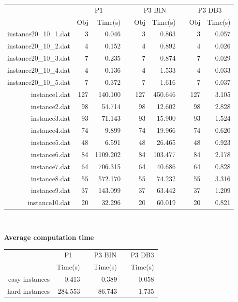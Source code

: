 \newpage
\begin{table*}[h!]\centering
{}
\begin{tabular}{@{}rrrcrrcrr@{}}\toprule
& \multicolumn{2}{c}{P1} & \phantom{abc} & \multicolumn{2}{c}{P3 BIN} & \phantom{abc} & \multicolumn{2}{c}{P3 DB3}\\
\cmidrule{2-3} \cmidrule{5-6} \cmidrule{8-9}
& Obj & Time(s) & & Obj & Time(s) & & Obj & Time(s)\\ \midrule
instance20\_10\_1.dat & 3 & 0.046 & & 3 & 0.863 & & 3 & 0.057 \\
instance20\_10\_2.dat & 4 & 0.152 & & 4 & 0.892 & & 4 & 0.026 \\
instance20\_10\_3.dat & 7 & 0.235 & & 7 & 0.874 & & 7 & 0.029 \\
instance20\_10\_4.dat & 4 & 0.136 & & 4 & 1.533 & & 4 & 0.033 \\
instance20\_10\_5.dat & 7 & 0.372 & & 7 & 1.616 & & 7 & 0.037 \\
instance1.dat & 127 & 140.100 & & 127 & 450.646 & & 127 & 3.105 \\
instance2.dat & 98 & 54.714 & & 98 & 12.602 & & 98 & 2.828 \\
instance3.dat & 93 & 71.143 & & 93 & 15.900 & & 93 & 1.524 \\
instance4.dat & 74 & 9.899 & & 74 & 19.966 & & 74 & 0.620 \\
instance5.dat & 48 & 6.591 & & 48 & 26.465 & & 48 & 0.923 \\
instance6.dat & 84 & 1109.202 & & 84 & 103.477 & & 84 & 2.178 \\
instance7.dat & 64 & 706.315 & & 64 & 40.686 & & 64 & 0.828 \\
instance8.dat & 55 & 572.170 & & 55 & 74.232 & & 55 & 3.316 \\
instance9.dat & 37 & 143.099 & & 37 & 63.442 & & 37 & 1.209 \\
instance10.dat & 20 & 32.296 & & 20 & 60.019 & & 20 & 0.821 \\
\bottomrule
\end{tabular}
\end{table*}\ \\

\begin{center}
\textbf{Average computation time}
\end{center}
\begin{table*}[h!]\centering
{}
\begin{tabular}{@{}rrcrcr@{}}\toprule
& \multicolumn{1}{c}{P1} & \phantom{abc} & \multicolumn{1}{c}{P3 BIN} & \phantom{abc} & \multicolumn{1}{c}{P3 DB3}\\
& Time(s) & & Time(s) & & Time(s)\\ \midrule
easy instances & 0.413 & & 0.389 & & 0.058 \\
hard instances & 284.553 & & 86.743 & & 1.735 \\
\bottomrule
\end{tabular}
\end{table*}\ \\

